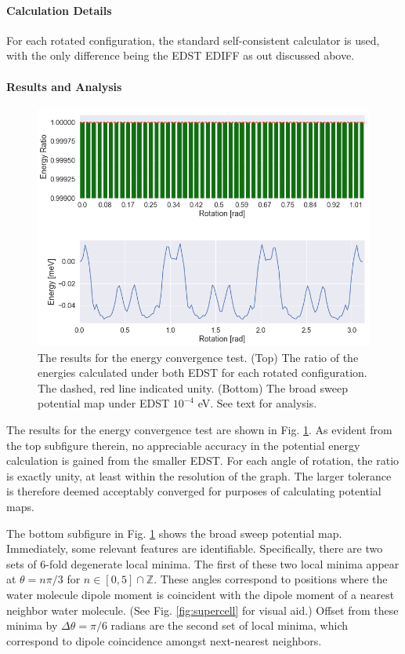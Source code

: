         \paragraph{Calculation Details} For each rotated configuration, the standard self-consistent calculator is used, with the only difference being the EDST EDIFF as out discussed above.
        
        \paragraph{Results and Analysis}
        
        \begin{figure}
            \centering
            \includegraphics[width=0.8\linewidth]{Figures/System/pmap_convergence.png}
            \caption{The results for the energy convergence test. (Top) The ratio of the energies calculated under both EDST for each rotated configuration. The dashed, red line indicated unity. (Bottom) The broad sweep potential map under EDST $10^{-4}$ eV. See text for analysis. }
            \label{fig:pmap_convergence}
        \end{figure}
        
        The results for the energy convergence test are shown in Fig. \ref{fig:pmap_convergence}. As evident from the top subfigure therein, no appreciable accuracy in the potential energy calculation is gained from the smaller EDST. For each angle of rotation, the ratio is exactly unity, at least within the resolution of the graph. The larger tolerance is therefore deemed acceptably converged for purposes of calculating potential maps.
        
        The bottom subfigure in Fig. \ref{fig:pmap_convergence} shows the broad sweep potential map. Immediately, some relevant features are identifiable. Specifically, there are two sets of 6-fold degenerate local minima. The first of these two local minima appear at $\theta = n\pi/3$ for $n\in \left[0,5\right] \cap \mathbb{Z}$. These angles correspond to positions where the water molecule dipole moment is coincident with the dipole moment of a nearest neighbor water molecule. (See Fig. \ref{fig:supercell} for visual aid.) Offset from these minima by $\Delta \theta = \pi/6$ radians are the second set of local minima, which correspond to dipole coincidence amongst next-nearest neighbors. 
        
